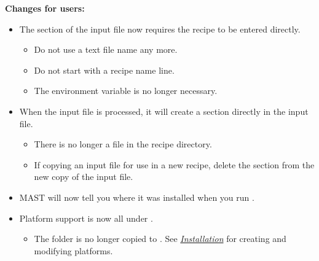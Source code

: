 \documentclass[letterpaper,10pt,english]{sphinxmanual}
\begin{document}
\textbf{Changes for users:}
\begin{itemize}
\item {} 
The  section of the input file now requires the recipe to be entered directly.
\begin{itemize}
\item {} 
Do not use a text file name any more.

\item {} 
Do not start with a recipe name line.

\item {} 
The  environment variable is no longer necessary.

\end{itemize}

\item {} 
When the input file is processed, it will create a  section directly in the input file.
\begin{itemize}
\item {} 
There is no longer a  file in the recipe directory.

\item {} 
If copying an input file for use in a new recipe, delete the  section from the new copy of the input file.

\end{itemize}

\item {} 
MAST will now tell you where it was installed when you run .

\item {} 
Platform support is now all under .
\begin{itemize}
\item {} 
The  folder is no longer copied to . See {\hyperref[1_0_installation::doc]{\emph{Installation}}} for creating and modifying platforms.

\end{itemize}

\end{itemize}
\end{document}
